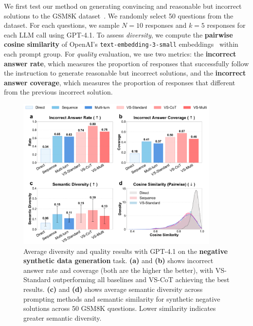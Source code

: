 We first test our method on generating convincing and reasonable but incorrect solutions to the GSM8K dataset~\citep{cobbe2021trainingverifierssolvemath}. We randomly select 50 questions from the dataset. For each questions, we sample $N=10$ responses and $k=5$ responses for each LLM call using GPT-4.1. To assess \textit{diversity}, we compute the \textbf{pairwise cosine similarity} of OpenAI’s \texttt{text-embedding-3-small} embeddings~\citep{openai2024embedding} within each prompt group. For \textit{quality} evaluation, we use two metrics: the \textbf{incorrect answer rate}, which measures the proportion of responses that successfully follow the instruction to generate reasonable but incorrect solutions, and the \textbf{incorrect answer coverage}, which measures the proportion of responses that different from the previous incorrect solution.

\begin{figure}[h]
  \centering
  \includegraphics[width=0.9\textwidth]{figures/qualitative_tasks/synthetic_data_negative_gpt-4.1_diversity_quality_histogram.pdf}
  \caption{Average diversity and quality results with GPT-4.1 on the \textbf{negative synthetic data generation} task.
  \textbf{(a)} and \textbf{(b)} shows incorrect answer rate and coverage (both are the higher the better), with VS-Standard outperforming all baselines and VS-CoT achieving the best results.
  \textbf{(c)} and \textbf{(d)} shows average semantic diversity across prompting methods and semantic similarity for synthetic negative solutions across 50 GSM8K questions. Lower similarity indicates greater semantic diversity.
  }
  \label{fig:synthetic_negative_combined_results}
\end{figure}

